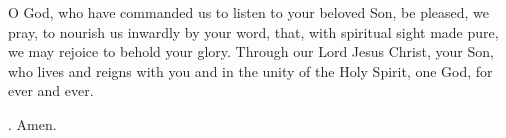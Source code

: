 \lettrine[lines=3]{O}{} God, who have commanded us
to listen to your beloved Son,
be pleased, we pray,
to nourish us inwardly by your word,
that, with spiritual sight made pure,
we may rejoice to behold your glory.
Through our Lord Jesus Christ, your Son,
who lives and reigns with you and in the unity of the Holy Spirit,
one God, for ever and ever. \par \Rbar. Amen.
